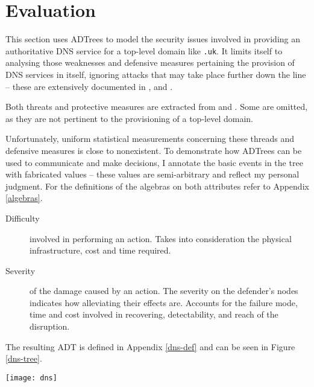 \documentclass{scrreprt}
\begin{document}
\chapter{Evaluation}
\label{evaluation}

This section uses ADTrees to model the security issues involved in providing an
authoritative DNS service for a top-level domain like \texttt{.uk}. It limits
itself to analysing those weaknesses and defensive measures pertaining the
provision of DNS services in itself, ignoring attacks that may take place
further down the line -- these are extensively documented in
\cite{weaknesses-dns}, \cite{rfc3833} and \cite{dns-bind-sec}.

Both threats and protective measures are extracted from \cite[sections 3, 5, 7,
and 10]{secdns} and \cite{dns-threat-analysis}. Some are omitted, as they are
not pertinent to the provisioning of a top-level domain. 

Unfortunately, uniform statistical measurements concerning these threads and
defensive measures is close to nonexistent. To demonstrate how ADTrees can be
used to communicate and make decisions, I annotate the basic events in the tree
with fabricated values -- these values are semi-arbitrary and reflect my
personal judgment. For the definitions of the algebras on both attributes refer
to Appendix \ref{algebras}.

\begin{description}
    \item [Difficulty] involved in performing an action. Takes into
        consideration the physical infrastructure, cost and time required.
    \item [Severity] of the damage caused by an action. The severity on the
        defender's nodes indicates how alleviating their effects are. Accounts
        for the failure mode, time and cost involved in recovering,
        detectability, and reach of the disruption.
\end{description}

The resulting ADT is defined in Appendix \ref{dns-def} and can be seen in Figure
\ref{dns-tree}.


\begin{sidewaysfigure}[h]
    \label{dns-tree}
    \centering
    \texttt{[image: dns]}
    \caption{}
\end{sidewaysfigure}
\restoregeometry
\end{document}
